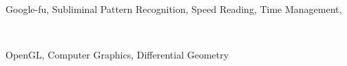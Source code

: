 \documentclass[a4paper]{MagicalCV}
\begin{document}
\begin{minipage}[t]{0.33\textwidth}
\\
Google-fu, Subliminal Pattern Recognition, Speed Reading, Time Management,
\sectionsep


 \\
\begin{tightemize}
\item  OpenGL, Computer Graphics, Differential Geometry
\end{tightemize}
\sectionsep


\end{minipage} 
\end{document}
